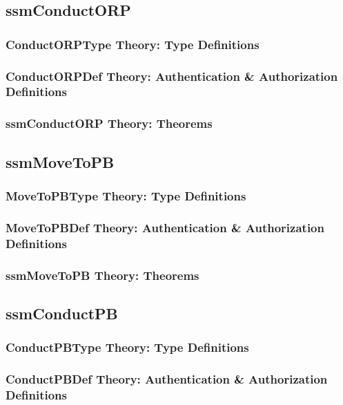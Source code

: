 \documentclass[hidelinks,12pt,a4paper]{report}
\begin{document}
\begin{appendices}
\subsection{ssmConductORP}
\subsubsection{ConductORPType Theory: Type Definitions}

\subsubsection{ConductORPDef Theory: Authentication \& Authorization Definitions}

\subsubsection{ssmConductORP Theory: Theorems}



\subsection{ssmMoveToPB}
\subsubsection{MoveToPBType Theory: Type Definitions}
\subsubsection{MoveToPBDef Theory: Authentication \& Authorization Definitions}
\subsubsection{ssmMoveToPB Theory: Theorems}

\subsection{ssmConductPB}
\subsubsection{ConductPBType Theory: Type Definitions}
\subsubsection{ConductPBDef Theory: Authentication \& Authorization Definitions}

\end{appendices}
\end{document}

